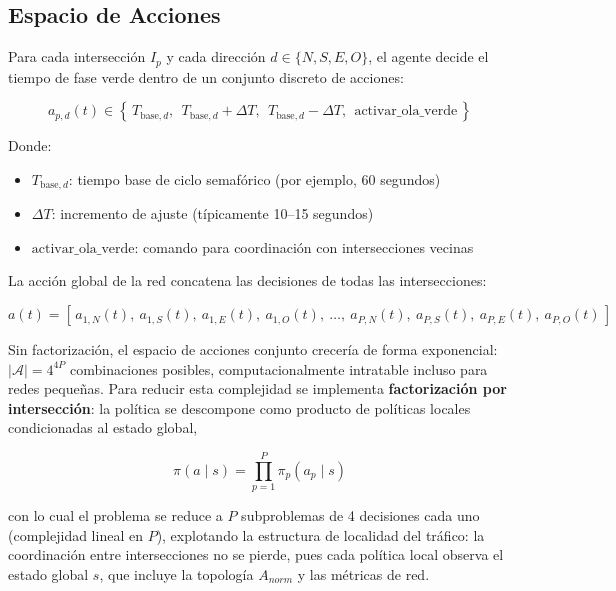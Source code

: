 \documentclass[12pt,a4paper,oneside]{report}
\begin{document}
\subsection{Espacio de Acciones}\label{espacio-de-acciones}

Para cada intersección \(I_{p}\) y cada dirección \(d \in \{N, S, E, O\}\), el agente decide el tiempo de fase verde dentro de un conjunto discreto de acciones:

\begin{equation}
a_{p,d}(t) \in \left\{\, T_{\text{base},d},\ \ T_{\text{base},d} + \Delta T,\ \ T_{\text{base},d} - \Delta T,\ \ \text{activar\_ola\_verde} \,\right\}
\label{eq:accion}
\end{equation}

Donde:

\begin{itemize}
\item
  \(T_{\text{base},d}\): tiempo base de ciclo semafórico (por ejemplo, 60 segundos)
\item
  \(\Delta T\): incremento de ajuste (típicamente 10--15 segundos)
\item
  \(\text{activar\_ola\_verde}\): comando para coordinación con intersecciones vecinas
\end{itemize}

La acción global de la red concatena las decisiones de todas las intersecciones:

\begin{equation}
a(t) = \left[\, a_{1,N}(t),\ a_{1,S}(t),\ a_{1,E}(t),\ a_{1,O}(t),\ \ldots,\ a_{P,N}(t),\ a_{P,S}(t),\ a_{P,E}(t),\ a_{P,O}(t) \,\right]
\label{eq:accionglobal}
\end{equation}

Sin factorización, el espacio de acciones conjunto crecería de forma exponencial: \(|\mathcal{A}| = 4^{4P}\) combinaciones posibles, computacionalmente intratable incluso para redes pequeñas. Para reducir esta complejidad se implementa \textbf{factorización por intersección}: la política se descompone como producto de políticas locales condicionadas al estado global,

\begin{equation}
\pi(a \mid s) = \prod_{p = 1}^{P}\pi_{p}\!\left(a_{p} \mid s\right)
\label{eq:factorizacion}
\end{equation}

con lo cual el problema se reduce a \(P\) subproblemas de 4 decisiones cada uno (complejidad lineal en \(P\)), explotando la estructura de localidad del tráfico: la coordinación entre intersecciones no se pierde, pues cada política local observa el estado global \(s\), que incluye la topología \(A_{norm}\) y las métricas de red.
\end{document}
